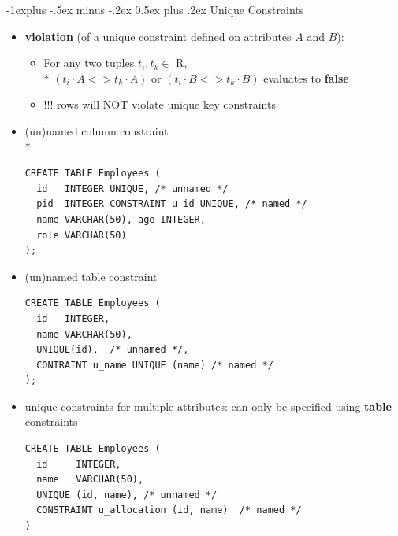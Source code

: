 \documentclass[10pt, landscape]{article}
\makeatletter
\renewcommand{\subsection}{\@startsection{subsection}{2}{0mm}%
  {-1explus -.5ex minus -.2ex}%
  {0.5ex plus .2ex}%
{\normalfont\normalsize\bfseries}}
\makeatother
\begin{document}
\begin{multicols}{3}
  \subsection{Unique Constraints}
  \begin{itemize}
    \item \textbf{violation} (of a unique constraint defined on attributes $A$ and $B$):
      \begin{itemize}
        \item For any two tuples $t_i, t_k \in$ R, \\*
          $(t_i\cdot A <> t_k\cdot A)$ or  $(t_i\cdot B <> t_k \cdot B)$ evaluates to  \textbf{false}
        \item  !!!  rows will NOT violate unique key constraints
      \end{itemize}
    \item (un)named column constraint \\*
      \begin{lstlisting}[style=mySQL]
CREATE TABLE Employees (
  id   INTEGER UNIQUE, /* unnamed */
  pid  INTEGER CONSTRAINT u_id UNIQUE, /* named */
  name VARCHAR(50), age INTEGER,
  role VARCHAR(50)
);
      \end{lstlisting}
    \item (un)named table constraint
      \begin{lstlisting}[style=mySQL]
CREATE TABLE Employees (
  id   INTEGER,
  name VARCHAR(50), 
  UNIQUE(id),  /* unnamed */,
  CONTRAINT u_name UNIQUE (name) /* named */
);
      \end{lstlisting}
    \item unique constraints for multiple attributes: can only be specified using \textbf{table} constraints
      \begin{lstlisting}[style=mySQL]
CREATE TABLE Employees (
  id     INTEGER,
  name   VARCHAR(50),
  UNIQUE (id, name), /* unnamed */
  CONSTRAINT u_allocation (id, name)  /* named */
)
      \end{lstlisting}
  \end{itemize}


\end{multicols}
\end{document}
